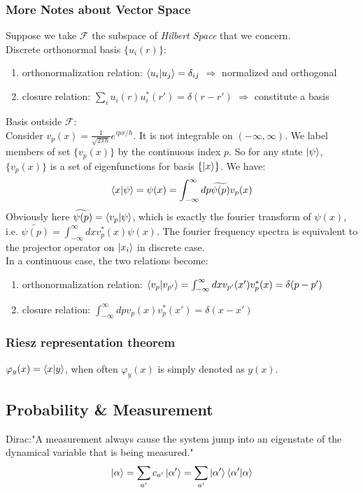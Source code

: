 \documentclass[a4paper, 11pt]{article}
\begin{document}
\subsubsection{More Notes about Vector Space}
Suppose we take $\mathcal{F}$ the subspace of \textit{Hilbert Space} that we concern. \\
Discrete orthonormal basis $\{u_i(r)\}$:
 \begin{enumerate}
 \item orthonormalization relation: $\braket{u_i|u_j} = \delta_{ij}$ $\Longrightarrow$ normalized and orthogonal
 \item closure relation: $\sum_{i}u_i(r)u_i^*(r') = \delta(r - r')$ $\Longrightarrow$ constitute a basis
 \end{enumerate}
Basis outside $\mathcal{F}$: \\
\indent Consider $v_p(x) = \frac{1}{\sqrt{2\pi \hbar}} e^{ipx/\hbar}$. It is not integrable on $(-\infty, \infty)$. We label members of set $\{v_p(x)\}$ by the continuous index $p$. So for any state $\ket{\psi}$, $\{v_p(x)\}$ is a set of eigenfunctions for basis $\{\ket{x}\}$. We have:
\begin{equation}
\braket{x|\psi} = \psi(x) = \int_{-\infty}^{\infty}dp \widetilde{\psi(p)} v_p(x)
\end{equation}
\indent Obviously here $\widetilde{\psi(p)} = \braket{v_p|\psi}$, which is exactly the fourier transform of $\psi(x)$, i.e. $\widetilde{\psi(p)} = \int_{-\infty}^{\infty}dx v_p^*(x) \psi(x)$. The fourier frequency spectra is equivalent to the projector operator on $\ket{x_i}$ in discrete case.\\
\indent In a continuous case, the two relations become:
\begin{enumerate}
\item orthonormalization relation: $\braket{v_{p}|v_{p'}} = \int_{-\infty}^{\infty}dx v_{p'}(x')v_p^*(x) = \delta(p - p')$
\item closure relation: $\int_{-\infty}^{\infty} dp v_p(x)v^*_{p}(x') = \delta(x - x')$
\end{enumerate}

\subsubsection{Riesz representation theorem}
$\varphi_y(x) = \braket{x|y}$, when often $\varphi_y(x)$ is simply denoted as $y(x)$.

\subsection{Probability \& Measurement}
Dirac:"A measurement always cause the system jump into an eigenstate of the dynamical variable that is being measured."\\
\begin{equation}
 \ket{\alpha} = \sum_{a'}c_{a'}\ket{\alpha'} = \sum_{a'}\ket{\alpha'}\braket{\alpha'|\alpha}
\end{equation}
\end{document}
